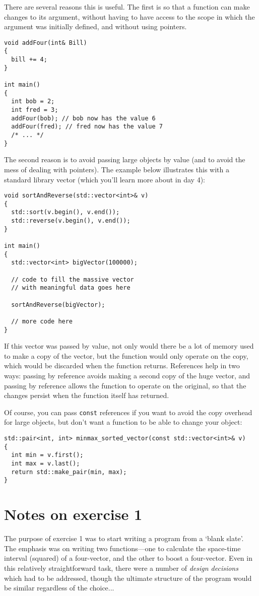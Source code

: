 \documentclass[a4paper]{scrartcl}
\begin{document}
There are several reasons this is useful. The first is so that a function can make changes to its argument, without having to have access to the scope in which the argument was initially defined, and without using pointers.

\begin{verbatim}
void addFour(int& Bill)
{
  bill += 4;
}

int main()
{
  int bob = 2;
  int fred = 3;
  addFour(bob); // bob now has the value 6
  addFour(fred); // fred now has the value 7
  /* ... */
}
\end{verbatim}

The second reason is to avoid passing large objects by value (and to avoid the mess of dealing with pointers). The example below illustrates this with a standard library vector (which you'll learn more about in day 4):

\begin{verbatim}
void sortAndReverse(std::vector<int>& v)
{
  std::sort(v.begin(), v.end());
  std::reverse(v.begin(), v.end());
}

int main()
{
  std::vector<int> bigVector(100000);
  
  // code to fill the massive vector
  // with meaningful data goes here

  sortAndReverse(bigVector);

  // more code here
}
\end{verbatim}

If this vector was passed by value, not only would there be a lot of memory used to make a copy of the vector, but the function would only operate on the copy, which would be discarded when the function returns. References help in two ways: passing by reference avoids making a second copy of the huge vector, and passing by reference allows the function to operate on the original, so that the changes persist when the function itself has returned.

Of course, you can pass \verb|const| references if you want to avoid the copy overhead for large objects, but don't want a function to be able to change your object:

\begin{verbatim}
std::pair<int, int> minmax_sorted_vector(const std::vector<int>& v)
{
  int min = v.first();
  int max = v.last();
  return std::make_pair(min, max);
}
\end{verbatim}

\section{Notes on exercise 1}
The purpose of exercise 1 was to start writing a program from a `blank slate'. The emphasis was on writing two functions---one to calculate the space-time interval (squared) of a four-vector, and the other to boost a four-vector. Even in this relatively straightforward task, there were a number of \emph{design decisions} which had to be addressed, though the ultimate structure of the program would be similar regardless of the choice...
\end{document}
